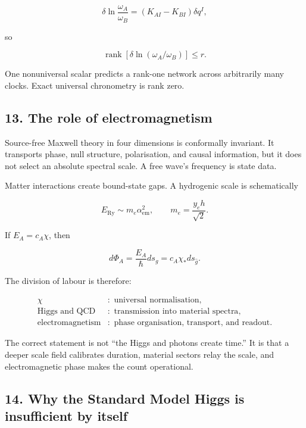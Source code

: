 \documentclass[
]{article}
\begin{document}
\[
\delta\ln\frac{\omega_A}{\omega_B}
=(K_{AI}-K_{BI})\delta q^I,
\]

so

\[
\boxed{
\operatorname{rank}\left[\delta\ln(\omega_A/\omega_B)\right]\le r.
}
\]

One nonuniversal scalar predicts a rank-one network across arbitrarily
many clocks. Exact universal chronometry is rank zero.

\hypertarget{the-role-of-electromagnetism}{%
\subsection{13. The role of
electromagnetism}\label{the-role-of-electromagnetism}}

Source-free Maxwell theory in four dimensions is conformally invariant.
It transports phase, null structure, polarisation, and causal
information, but it does not select an absolute spectral scale. A free
wave's frequency is state data.

Matter interactions create bound-state gaps. A hydrogenic scale is
schematically

\[
E_{\mathrm{Ry}}\sim m_e\alpha_{\mathrm{em}}^2,
\qquad
m_e=\frac{y_eh}{\sqrt2}.
\]

If \(E_A=c_A\chi\), then

\[
d\Phi_A=\frac{E_A}{\hbar}ds_g
=c_A\chi_*ds_{\widehat g}.
\]

The division of labour is therefore:

\[
\boxed{
\begin{aligned}
\chi&:\text{ universal normalisation},\\
\text{Higgs and QCD}&:\text{ transmission into material spectra},\\
\text{electromagnetism}&:\text{ phase organisation, transport, and readout}.
\end{aligned}}
\]

The correct statement is not ``the Higgs and photons create time.'' It
is that a deeper scale field calibrates duration, material sectors relay
the scale, and electromagnetic phase makes the count operational.

\hypertarget{why-the-standard-model-higgs-is-insufficient-by-itself}{%
\subsection{14. Why the Standard Model Higgs is insufficient by
itself}\label{why-the-standard-model-higgs-is-insufficient-by-itself}}
\end{document}
